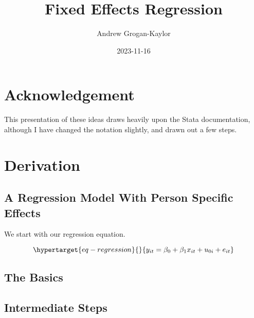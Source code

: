 \documentclass[
  letterpaper,
  DIV=11,
  numbers=noendperiod]{scrartcl}
\title{Fixed Effects Regression}
\author{Andrew Grogan-Kaylor}
\date{2023-11-16}
\renewcommand*\contentsname{Table of contents}
\newcommand\contentsname{Table of contents}
\begin{document}
\maketitle
\ifdefined\Shaded\renewenvironment{Shaded}{\begin{tcolorbox}[enhanced, sharp corners, frame hidden, boxrule=0pt, interior hidden, borderline west={3pt}{0pt}{shadecolor}, breakable]}{\end{tcolorbox}}\fi

\renewcommand*\contentsname{Table of contents}
{
\hypersetup{linkcolor=}
\setcounter{tocdepth}{3}
\tableofcontents
}
\hypertarget{acknowledgement}{%
\section{Acknowledgement}\label{acknowledgement}}

This presentation of these ideas draws heavily upon the Stata
documentation, although I have changed the notation slightly, and drawn
out a few steps.

\hypertarget{derivation}{%
\section{Derivation}\label{derivation}}

\hypertarget{a-regression-model-with-person-specific-effects}{%
\subsection{A Regression Model With Person Specific
Effects}\label{a-regression-model-with-person-specific-effects}}

We start with our regression equation.

\begin{equation}\protect\hypertarget{eq-regression}{}{y_{it} = \beta_0 + \beta_1 x_{it} + u_{0i} + e_{it}}\label{eq-regression}\end{equation}

\hypertarget{the-basics}{%
\subsection{The Basics}\label{the-basics}}

\hypertarget{intermediate-steps}{%
\subsection{Intermediate Steps}\label{intermediate-steps}}
\end{document}
